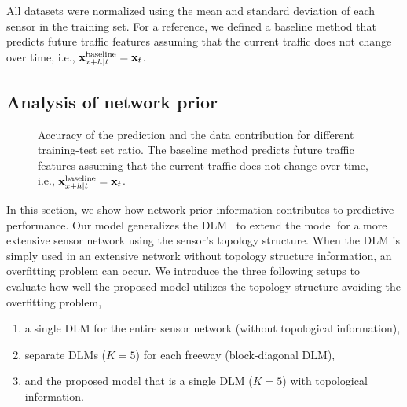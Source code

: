 \documentclass[journal]{IEEEtran}
\begin{document}
All datasets were normalized using the mean and standard deviation of each sensor in the training set.
For a reference, we defined a baseline method that predicts future traffic features assuming that the current traffic does not change over time, i.e., ${\bf{x}}_{x+h|t}^{\text{baseline}}={\bf{x}}_t$.



\subsection{Analysis of network prior}\label{sec:network_prior}
\begin{figure*}[!ht]
   \centering
   \hfill
   \hfill
   \hfill
   \hfill
   \caption{Accuracy of the prediction and the data contribution for different training-test set ratio. 
   The baseline method predicts future traffic features assuming that the current traffic does not change over time, i.e., ${\bf{x}}_{x+h|t}^{\text{baseline}}={\bf{x}}_t$.
   }\label{fig:rmse_performance_prior_data}
\end{figure*}

In this section, we show how network prior information contributes to predictive performance. 
Our model generalizes the DLM~\cite{kwak2020travel} to extend the model for a more extensive sensor network using the sensor's topology structure. 
When the DLM is simply used in an extensive network without topology structure information, an overfitting problem can occur. 
We introduce the three following setups to evaluate how well the proposed model utilizes the topology structure avoiding the overfitting problem,
\begin{enumerate}
\item a single DLM for the entire sensor network (without topological information),
\item separate DLMs ($K=5$) for each freeway (block-diagonal DLM),
\item and the proposed model that is a single DLM ($K=5$) with topological information.
\end{enumerate}
\end{document}

